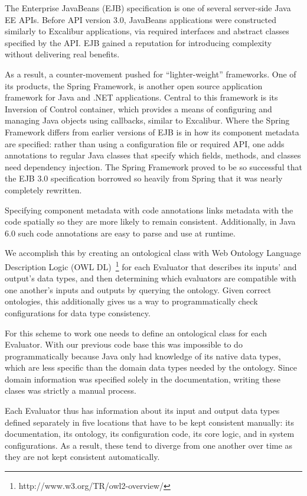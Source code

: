 \documentclass{elsart}
\begin{document}
The Enterprise JavaBeans (EJB) specification is one of several server-side Java EE APIs.  Before API version 3.0, JavaBeans applications were constructed similarly to Excalibur applications, via required interfaces and abstract classes specified by the API.  EJB gained a reputation for introducing complexity without delivering real benefits.

As a result, a counter-movement pushed for ``lighter-weight'' frameworks.  One of its products, the Spring Framework, is another open source application framework for Java and .NET applications.  Central to this framework is its Inversion of Control container, which provides a means of configuring and managing Java objects using callbacks, similar to Excalibur.  Where the Spring Framework differs from earlier versions of EJB is in how its component metadata are specified:  rather than using a configuration file or required API, one adds annotations to regular Java classes that specify which fields, methods, and classes need dependency injection.  The Spring Framework proved to be so successful that the EJB 3.0 specification borrowed so heavily from Spring that it was nearly completely rewritten.

Specifying component metadata with code annotations links metadata with the code spatially so they are more likely to remain consistent.  Additionally, in Java 6.0 such code annotations are easy to parse and use at runtime.


We accomplish this by creating an ontological class with Web Ontology Language Description Logic (OWL DL)~\footnote{http://www.w3.org/TR/owl2-overview/} for each Evaluator that describes its inputs' and output's data types, and then determining which evaluators are compatible with one another's inputs and outputs by querying the ontology.  Given correct ontologies, this additionally gives us a way to programmatically check configurations for data type consistency.

For this scheme to work one needs to define an ontological class for each Evaluator.  With our previous code base this was impossible to do programmatically because Java only had knowledge of its native data types, which are less specific than the domain data types needed by the ontology.  Since domain information was specified solely in the documentation, writing these clases was strictly a manual process.

Each Evaluator thus has information about its input and output data types defined separately in five locations that have to be kept consistent manually:  its documentation, its ontology, its configuration code, its core logic, and in system configurations.  As a result, these tend to diverge from one another over time as they are not kept consistent automatically.
\end{document}
